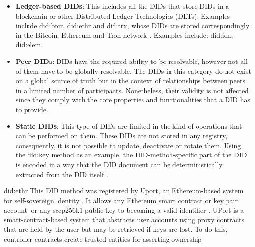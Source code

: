 \begin{itemize}
  \item \textbf{Ledger-based DIDs}: This includes all the DIDs that store DIDs in a blockchain or other Distributed Ledger Technologies (DLTs). Examples include did:btcr, did:ethr and did:trx, whose DIDs are stored correspondingly in the Bitcoin, Ethereum and Tron network \cite{preukschat_reed_2021}.
  Examples include: did:ion, did:elem.
  \item \textbf{Peer DIDs}: DIDs have the required ability to be resolvable, however not all of them have to be globally resolvable. The DIDs in this category do not exist on a global source of truth but in the context of relationships between peers in a limited number of participants. Nonetheless, their validity is not affected since they comply with the core properties and functionalities that a DID has to provide. 

  \item \textbf{Static DIDs}: This type of DIDs are limited in the kind of operations that can be performed on them. These DIDs are not stored in any registry, consequently, it is not possible to update, deactivate or rotate them. Using the did:key method as an example, the DID-method-specific part of the DID is encoded in a way that the DID document can be deterministically extracted from the DID itself \cite{longley_zagidulin_sporny_2022}.
\end{itemize}


did:ethr
This DID method was registered by Uport, an Ethereum-based system for self-sovereign identity \cite{Lundkvist_Heck_Torstensson_Mitton_Sena_2016}. It allows any Ethereum smart contract or key pair account, or any secp256k1 public key to becoming a valid identifier \cite{nistor_grassberger_carlin_2022}. UPort is a smart-contract-based system that abstracts user accounts using proxy contracts that are held by the user but may be retrieved if keys are lost. To do this, controller contracts create trusted entities for asserting ownership \cite{8783188}


